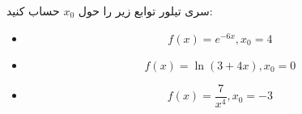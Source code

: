 سری تیلور توابع زیر را حول $x_{0}$ حساب کنید:

\begin{itemize}
    \item $$f(x) = e^{-6x}, x_{0} = 4$$
    \item $$f(x) = \ln(3 + 4x), x_{0} = 0$$
    \item $$f(x) = \frac{7}{x^{4}}, x_{0} = -3$$
\end{itemize}

\begin{comment}
    \href{https://tutorial.math.lamar.edu/problems/calcii/taylorseries.aspx}{solution}
\end{comment}